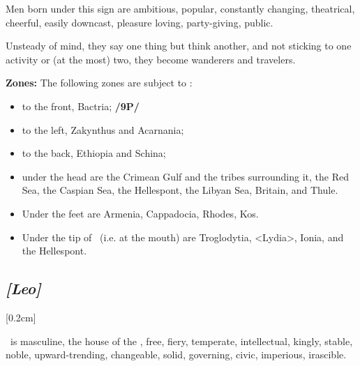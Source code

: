 Men born under this sign are ambitious, popular, constantly changing, theatrical, cheerful, easily downcast, pleasure loving, party-giving, public. 

Unsteady of mind, they say one thing but think another, and not sticking to one activity or (at the most) two, they become wanderers and travelers.

\textbf{Zones:} The following zones are subject to \Cancer: 
\begin{itemize}
\item to the front, Bactria; \textbf{/9P/}
\item to the left, Zakynthus and Acarnania; 
\item to the back, Ethiopia and Schina;
\item under the head are the Crimean Gulf and the tribes surrounding it, the Red Sea, the Caspian Sea, the Hellespont, the Libyan Sea, Britain, and Thule. 
\item Under the feet are Armenia, Cappadocia, Rhodes, Kos. \item Under the tip of \Cancer\, (i.e. at the mouth) are Troglodytia, <Lydia>, Ionia, and the Hellespont.
\end{itemize}

\secbr
\subsection{\textit{[Leo]}}
[0.2cm]

 \Leo\, is masculine, the house of the \Sun, free,  fiery, temperate, intellectual, kingly, stable, noble, upward-trending, changeable,  solid, governing, civic, imperious, irascible.

